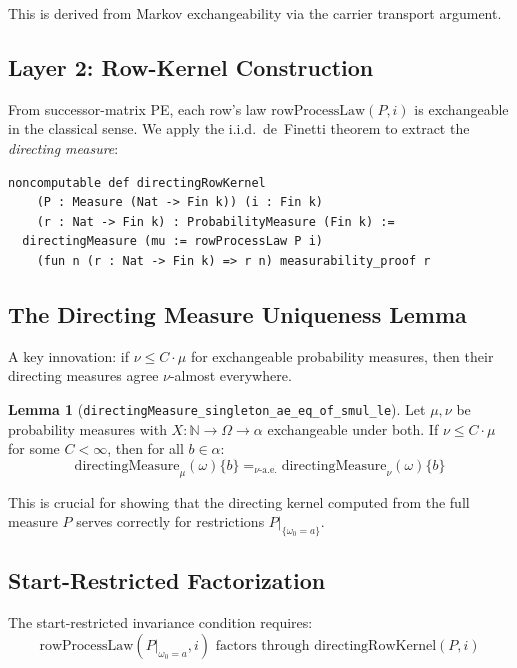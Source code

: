 \documentclass[11pt,a4paper]{article}
\theoremstyle{definition}
\newtheorem{lemma}[theorem]{Lemma}
\begin{document}
This is derived from Markov exchangeability via the carrier transport argument.

\subsection{Layer 2: Row-Kernel Construction}

From successor-matrix PE, each row's law $\mathrm{rowProcessLaw}(P, i)$ is
exchangeable in the classical sense. We apply the i.i.d.\ de~Finetti theorem
to extract the \emph{directing measure}:

\begin{lstlisting}
noncomputable def directingRowKernel
    (P : Measure (Nat -> Fin k)) (i : Fin k)
    (r : Nat -> Fin k) : ProbabilityMeasure (Fin k) :=
  directingMeasure (mu := rowProcessLaw P i)
    (fun n (r : Nat -> Fin k) => r n) measurability_proof r
\end{lstlisting}

\subsection{The Directing Measure Uniqueness Lemma}

A key innovation: if $\nu \leq C \cdot \mu$ for exchangeable probability
measures, then their directing measures agree $\nu$-almost everywhere.

\begin{lemma}[\texttt{directingMeasure\_singleton\_ae\_eq\_of\_smul\_le}]
\label{lem:unique}
Let $\mu, \nu$ be probability measures with $X : \mathbb{N} \to \Omega \to \alpha$
exchangeable under both. If $\nu \leq C \cdot \mu$ for some $C < \infty$, then
for all $b \in \alpha$:
\[
\mathrm{directingMeasure}_\mu(\omega)\{b\} =_{\nu\text{-a.e.}}
\mathrm{directingMeasure}_\nu(\omega)\{b\}
\]
\end{lemma}

This is crucial for showing that the directing kernel computed from the full
measure $P$ serves correctly for restrictions $P|_{\{\omega_0 = a\}}$.

\subsection{Start-Restricted Factorization}

The start-restricted invariance condition requires:
\[
\mathrm{rowProcessLaw}(P|_{\omega_0 = a}, i) \text{ factors through }
\mathrm{directingRowKernel}(P, i)
\]
\end{document}
